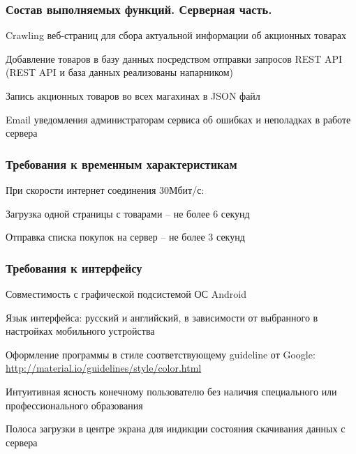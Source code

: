 \subsubsection{Состав выполняемых функций. Серверная часть.}
\begin{my_enumerate}
\item Crawling веб-страниц для сбора актуальной информации об акционных товарах
\item Добавление товаров в базу данных посредством отправки запросов REST API (REST API и база данных реализованы напарником)
\item Запись акционных товаров во всех магахинах в JSON файл
\item Email уведомления администраторам сервиса об ошибках и неполадках в работе сервера
\end{my_enumerate}

\subsubsection{Требования к временным характеристикам}
При скорости интернет соединения 30Мбит/с:
\begin{my_enumerate}
\item Загрузка одной страницы с товарами -- не более 6 секунд
\item Отправка списка покупок на сервер -- не более 3 секунд
\end{my_enumerate}

\subsubsection{Требования к интерфейсу}
\begin{my_enumerate}
\item Совместимость с графической подсистемой ОС Android {\textregistered}
\item Язык интерфейса: русский и английский, в зависимости от выбранного в настройках мобильного устройства
\item Оформление программы в стиле соответствующему guideline от Google: \url{http://material.io/guidelines/style/color.html}
\item Интуитивная ясность конечному пользователю без наличия специального или профессионального образования
\item Полоса загрузки в центре экрана для индикции состояния скачивания данных с сервера
\end{my_enumerate}

